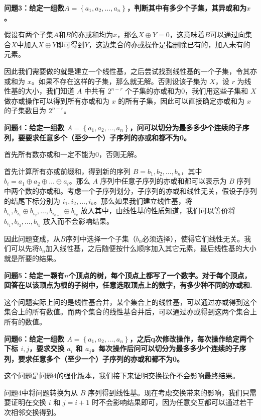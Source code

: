 \documentclass[UTF8, twoside]{ctexart}
\begin{document}
\begin{sloppypar}
\textbf{问题3：给定一组数$A=\left\{a_1,a_2,\ldots,a_n\right\}$，判断其中有多少个子集，其异或和为$x$。}

假设有两个子集$A$和$B$的亦或和均为$x$，那么$X\oplus Y=0$，这意味着$B$可以通过向集合$X$中加入$X\oplus Y$即可得到$Y$，这边集合的亦或操作是指删除已有的，加入未有的元素。

因此我们需要做的就是建立一个线性基，之后尝试找到线性基的一个子集，令其亦或和为 $x$。如果不存在这样的子集，那么就无解。否则设该子集为 $X$，设 $r$ 为线性基的大小，我们知道 $A$ 中共有 $2^{n-r}$ 个子集的亦或和为0，我们用这些子集和 $X$ 做亦或操作可以得到所有亦或和为 $x$ 的所有子集，因此可以直接确定亦或和为 $x$ 的子集数目为 $2^{n-r}$。

\textbf{问题4：给定一组数 $A=\left\{a_1,a_2,\ldots,a_n\right\}$，问可以切分为最多多少个连续的子序列，要要求任意多个（至少一个）子序列的亦或和都不为0。}

首先所有数亦或和一定不能为0，否则无解。

首先计算所有亦或前缀和，得到新的序列 $B=b_1,b_2,\ldots, b_n$，其中 $b_i=a_1\oplus a_2\oplus \ldots \oplus a_i$。那么 $A$ 序列中任意子序列的亦或和都可以表示为 $B$ 序列中两个数的亦或和。考虑一个子序列划分，子序列的亦或和线性无关，假设子序列的结尾下标分别为 $i_1,i_2,\ldots, i_k$。那么如果我们建立线性基，将 $b_{i_1},b_{i_1}\oplus b_{i_2}, \ldots, b_{i_{k-1}}\oplus b_{i_k}$ 放入其中，由线性基的性质知道，我们可以等价将 $b_{i_1},b_{i_2},\ldots, b_{i_k}$ 放入而不会影响结果。

因此问题变成，从$B$序列中选择一个子集（$b_n$必须选择），使得它们线性无关。我们可以先将$b_n$加入线性基，之后随便按什么顺序加入其它元素，最后线性基的大小就是所要的结果。

\textbf{问题5：给定一颗有$n$个顶点的树，每个顶点上都写了一个数字。对于每个顶点，回答在以该顶点为根的子树中，任意选取顶点上的数字，有多少种不同的亦或和.}

这个问题实际上问的是线性基合并，某个集合上的线性基，可以通过亦或得到这个集合上的所有数值。而两个集合的线性基合并后，可以通过亦或得到这两个集合上所有的数值。

\textbf{问题6：给定一组数 $A=\left\{a_1,a_2,\ldots,a_n\right\}$，之后q次修改操作，每次操作给定两个下标 $i, j$，要求交换 $a_i$ 和 $a_j$。每次操作后问可以切分为最多多少个连续的子序列，要求任意多个（至少一个）子序列的亦或和都不为0。}

这个问题是问题4的强化版本，我们接下来证明交换操作不会影响最终结果。

问题4中将问题转换为从 $B$ 序列得到线性基。现在考虑交换带来的影响，我们只需要证明在交换 $i$ 和 $j=i+1$ 时不会影响结果即可，因为任意交互都可以通过若干次相邻交换得到。


\end{sloppypar}
\end{document}
